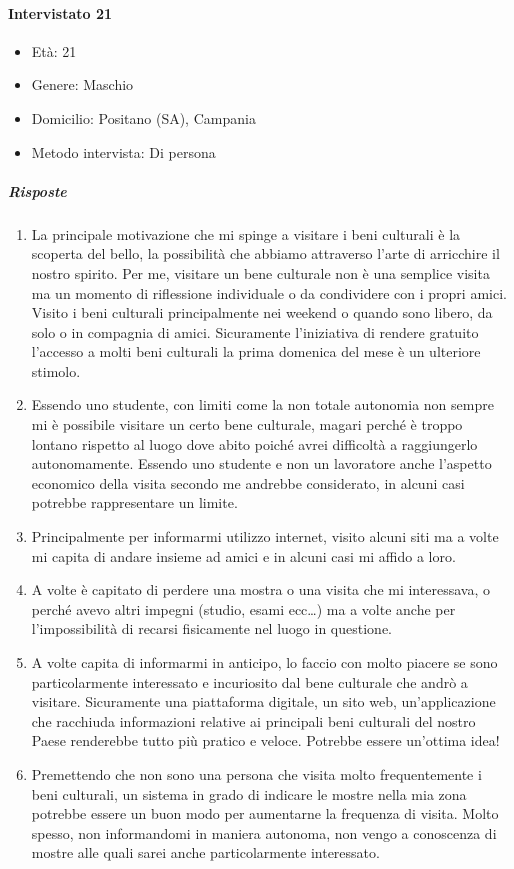 \documentclass{article}
\begin{document}
\paragraph{Intervistato 21}
\begin{itemize}
\item Età: 21
\item Genere: Maschio
\item Domicilio: Positano (SA), Campania
\item Metodo intervista: Di persona
\end{itemize}
\subparagraph{Risposte}
\begin{enumerate}
\item La principale motivazione che mi spinge a visitare i beni culturali è la scoperta del bello, la possibilità che abbiamo attraverso l’arte di arricchire il nostro spirito. Per me, visitare un bene culturale non è una semplice visita ma un momento di riflessione individuale o da condividere con i propri amici. Visito i beni culturali principalmente nei weekend o quando sono libero, da solo o in compagnia di amici. Sicuramente l’iniziativa di rendere gratuito l’accesso a molti beni culturali la prima domenica del mese è un ulteriore stimolo.
\item Essendo uno studente, con limiti come la non totale autonomia non sempre mi è possibile visitare un certo bene culturale, magari perché è troppo lontano rispetto al luogo dove abito poiché avrei difficoltà a raggiungerlo autonomamente. Essendo uno studente e non un lavoratore anche l’aspetto economico della visita secondo me andrebbe considerato, in alcuni casi potrebbe rappresentare un limite.
\item Principalmente per informarmi utilizzo internet, visito alcuni siti ma a volte mi capita di andare insieme ad amici e in alcuni casi mi affido a loro.
\item A volte è capitato di perdere una mostra o una visita che mi interessava, o perché avevo altri impegni (studio, esami ecc…) ma a volte anche per l’impossibilità di recarsi fisicamente nel luogo in questione.
\item A volte capita di informarmi in anticipo, lo faccio con molto piacere se sono particolarmente interessato e incuriosito dal bene culturale che andrò a visitare. Sicuramente una piattaforma digitale, un sito web, un’applicazione che racchiuda informazioni relative ai principali beni culturali del nostro Paese renderebbe tutto più pratico e veloce. Potrebbe essere un’ottima idea!
\item Premettendo che non sono una persona che visita molto frequentemente i beni culturali, un sistema in grado di indicare le mostre nella mia zona potrebbe essere un buon modo per aumentarne la frequenza di visita. Molto spesso, non informandomi in maniera autonoma, non vengo a conoscenza di mostre alle quali sarei anche particolarmente interessato.

\end{enumerate}
\end{document}
